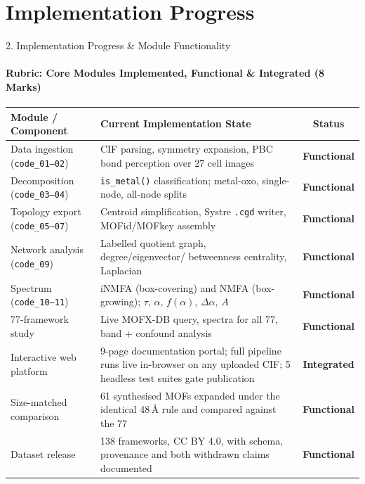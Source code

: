 \documentclass[aspectratio=169, 11pt]{beamer}
\begin{document}
\section{Implementation Progress}
\begin{frame}{2. Implementation Progress \& Module Functionality}
\framesubtitle{Rubric: Core Modules Implemented, Functional \& Integrated (8 Marks)}
\vspace{-0.32cm}
\begin{table}
\centering
\tiny
\renewcommand{\arraystretch}{0.99}
\begin{tabular}{p{3.0cm} p{7.0cm} c}
\toprule
\textbf{Module / Component} & \textbf{Current Implementation State} & \textbf{Status} \\
\midrule
Data ingestion (\texttt{code\_01--02}) & CIF parsing, symmetry expansion, PBC bond
perception over 27 cell images & \textcolor{okGreen}{\textbf{Functional}} \\
Decomposition (\texttt{code\_03--04}) & \texttt{is\_metal()} classification; metal-oxo,
single-node, all-node splits & \textcolor{okGreen}{\textbf{Functional}} \\
Topology export (\texttt{code\_05--07}) & Centroid simplification, Systre \texttt{.cgd}
writer, MOFid/MOFkey assembly & \textcolor{okGreen}{\textbf{Functional}} \\
Network analysis (\texttt{code\_09}) & Labelled quotient graph, degree/eigenvector/
betweenness centrality, Laplacian & \textcolor{okGreen}{\textbf{Functional}} \\
Spectrum (\texttt{code\_10--11}) & iNMFA (box-covering) and NMFA (box-growing);
$\tau$, $\alpha$, $f(\alpha)$, $\Delta\alpha$, $A$ & \textcolor{okGreen}{\textbf{Functional}} \\
77-framework study & Live MOFX-DB query, spectra for all 77, band + confound analysis &
\textcolor{okGreen}{\textbf{Functional}} \\
Interactive web platform & 9-page documentation portal; full pipeline runs live in-browser
on any uploaded CIF; 5 headless test suites gate publication &
\textcolor{okGreen}{\textbf{Integrated}} \\
Size-matched comparison & 61 synthesised MOFs expanded under the identical 48\,\AA{} rule
and compared against the 77 & \textcolor{okGreen}{\textbf{Functional}} \\
Dataset release & 138 frameworks, CC BY 4.0, with schema, provenance and both withdrawn
claims documented & \textcolor{okGreen}{\textbf{Functional}} \\

\end{tabular}
\end{table}
\end{frame}
\end{document}
